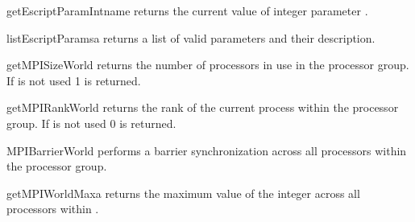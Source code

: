 \begin{funcdesc}{getEscriptParamInt}{name}
returns the current value of integer parameter .
\end{funcdesc}

\begin{funcdesc}{listEscriptParams}{a}
returns a list of valid parameters and their description.
\end{funcdesc}

\begin{funcdesc}{getMPISizeWorld}{}
returns the number of \MPI processors in use in the  processor group.
If \MPI is not used 1 is returned.
\end{funcdesc}

\begin{funcdesc}{getMPIRankWorld}{}
returns the rank of the current process within the 
processor group. If \MPI is not used 0 is returned.
\end{funcdesc}

\begin{funcdesc}{MPIBarrierWorld}{}
performs a barrier synchronization across all processors within the
 processor group.
\end{funcdesc}

\begin{funcdesc}{getMPIWorldMax}{a}
returns the maximum value of the integer  across all processors within
.
\end{funcdesc}

